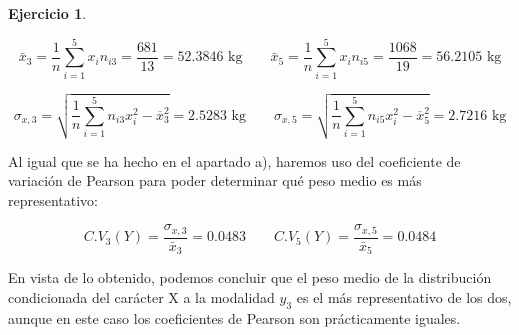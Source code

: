 \documentclass[a4paper, 12pt]{article}
\theoremstyle{definition}
\newtheorem{ej}{Ejercicio}
\begin{document}
\begin{ej}
\begin{enumerate}[label=\alph*)]
\[
	\bar{x}_{3} = \frac{1}{n} \sum_{i=1}^{5} x_i n_{i3} = \frac{681}{13} =  52.3846\text{ kg} \qquad \bar{x}_{5} = \frac{1}{n} \sum_{i=1}^{5} x_i n_{i5} = \frac{1068}{19} =  56.2105\text{ kg} 
\]

\[
	\sigma_{x,3} = \sqrt{\frac{1}{n} \sum_{i=1}^{5} n_{i3} x_i^2 - \overline{x}_{3}^{2}} = 2.5283 \text{ kg} \qquad \sigma_{x,5} = \sqrt{\frac{1}{n} \sum_{i=1}^{5} n_{i5} x_i^2 - \overline{x}_{5}^{2}} = 2.7216 \text{ kg}
\]

Al igual que se ha hecho en el apartado a), haremos uso del coeficiente de variación de Pearson para poder determinar qué peso medio es más representativo:

\[
	C.V_3(Y) = \frac{\sigma_{x,3}}{\bar{x}_{3}} = 0.0483 \qquad C.V_5(Y) = \frac{\sigma_{x,5}}{\bar{x}_{5}} = 0.0484
\]

En vista de lo obtenido, podemos concluir que el peso medio de la distribución condicionada del carácter X a la modalidad $y_3$ es el más representativo de los dos, aunque en este caso los coeficientes de Pearson son prácticamente iguales.
\end{enumerate}
\end{ej}
\end{document}
